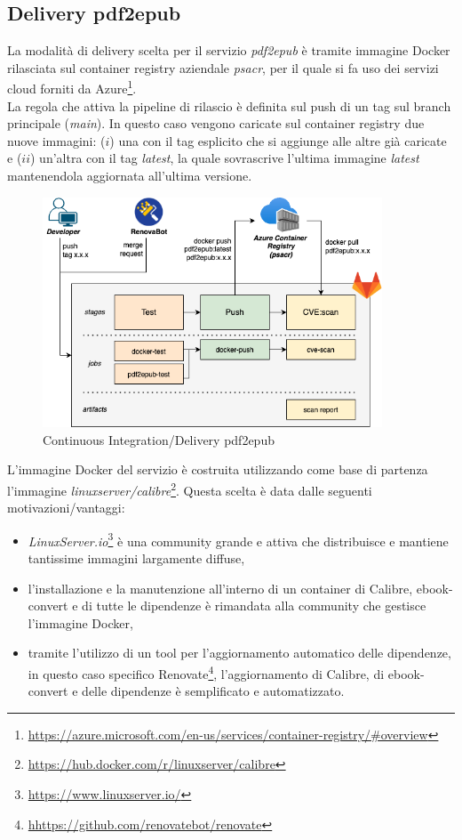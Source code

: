 \subsection{Delivery pdf2epub}
La modalità di delivery scelta per il servizio \textit{pdf2epub} è tramite immagine Docker rilasciata sul container registry aziendale \textit{psacr}, per il quale si fa uso dei servizi cloud forniti da Azure\footnote{\url{https://azure.microsoft.com/en-us/services/container-registry/\#overview}}.\\
La regola che attiva la pipeline di rilascio è definita sul push di un tag sul branch principale (\textit{main}). In questo caso vengono caricate sul container registry due nuove immagini: ($i$) una con il tag esplicito che si aggiunge alle altre già caricate e ($ii$) un'altra con il tag \textit{latest}, la quale sovrascrive l'ultima immagine \textit{latest} mantenendola aggiornata all'ultima versione.
\begin{figure}[H]
\centering
\includegraphics[width=0.9\textwidth]{img/tesi-6-pdf2epub.drawio.png}
\caption{Continuous Integration/Delivery pdf2epub}
\end{figure}
L'immagine Docker del servizio è costruita utilizzando come base di partenza l'immagine \textit{linuxserver/calibre}\footnote{\url{https://hub.docker.com/r/linuxserver/calibre}}. Questa scelta è data dalle seguenti motivazioni/vantaggi:
\begin{itemize}
    \item \textit{LinuxServer.io}\footnote{\url{https://www.linuxserver.io/}} è una community grande e attiva che distribuisce e mantiene tantissime immagini largamente diffuse,
    \item l'installazione e la manutenzione all'interno di un container di Calibre, ebook-convert e di tutte le dipendenze è rimandata alla community che gestisce l'immagine Docker,
    \item tramite l'utilizzo di un tool per l'aggiornamento automatico delle dipendenze, in questo caso specifico Renovate\footnote{\url{hhttps://github.com/renovatebot/renovate}}, l'aggiornamento di Calibre, di ebook-convert e delle dipendenze è semplificato e automatizzato.
\end{itemize}
